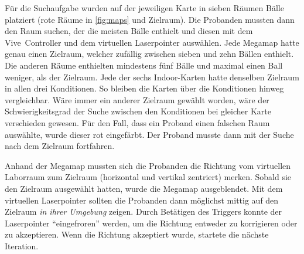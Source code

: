 Für die Suchaufgabe wurden auf der jeweiligen Karte in sieben Räumen Bälle platziert (rote Räume in \autoref{fig:maps} und Zielraum).
Die Probanden mussten dann den Raum suchen, der die meisten Bälle enthielt und diesen mit dem Vive~Controller und dem virtuellen Laserpointer auswählen.
Jede Megamap hatte genau einen Zielraum, welcher zufällig zwischen sieben und zehn Bällen enthielt.
Die anderen Räume enthielten mindestens fünf Bälle und maximal einen Ball weniger, als der Zielraum.
Jede der sechs Indoor-Karten hatte denselben Zielraum in allen drei Konditionen.
So bleiben die Karten über die Konditionen hinweg vergleichbar.
Wäre immer ein anderer Zielraum gewählt worden, wäre der Schwierigkeitsgrad der Suche zwischen den Konditionen bei gleicher Karte verschieden gewesen.
Für den Fall, dass ein Proband einen falschen Raum auswählte, wurde dieser rot eingefärbt.
Der Proband musste dann mit der Suche nach dem Zielraum fortfahren.

Anhand der Megamap mussten sich die Probanden die Richtung vom virtuellen Laborraum zum Zielraum (horizontal und vertikal zentriert) merken.
Sobald sie den Zielraum ausgewählt hatten, wurde die Megamap ausgeblendet.
Mit dem virtuellen Laserpointer sollten die Probanden dann möglichst mittig auf den Zielraum \emph{in ihrer Umgebung} zeigen.
Durch Betätigen des Triggers konnte der Laserpointer \enquote{eingefroren} werden, um die Richtung entweder zu korrigieren oder zu akzeptieren.
Wenn die Richtung akzeptiert wurde, startete die nächste Iteration.

